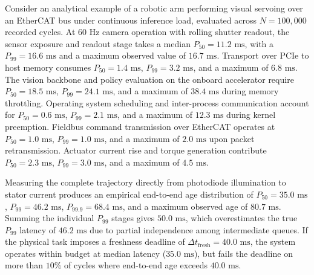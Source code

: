 \documentclass[
  letterpaper,
  DIV=11,
  numbers=noendperiod]{scrartcl}
\begin{document}
Consider an analytical example of a robotic arm performing visual
servoing over an EtherCAT bus under continuous inference load, evaluated
across \(N = 100{,}000\) recorded cycles. At \(60\text{ Hz}\) camera
operation with rolling shutter readout, the sensor exposure and readout
stage takes a median \(P_{50} = 11.2\text{ ms}\), with a
\(P_{99} = 16.6\text{ ms}\) and a maximum observed value of
\(16.7\text{ ms}\). Transport over PCIe to host memory consumes
\(P_{50} = 1.4\text{ ms}\), \(P_{99} = 3.2\text{ ms}\), and a maximum of
\(6.8\text{ ms}\). The vision backbone and policy evaluation on the
onboard accelerator require \(P_{50} = 18.5\text{ ms}\),
\(P_{99} = 24.1\text{ ms}\), and a maximum of \(38.4\text{ ms}\) during
memory throttling. Operating system scheduling and inter-process
communication account for \(P_{50} = 0.6\text{ ms}\),
\(P_{99} = 2.1\text{ ms}\), and a maximum of \(12.3\text{ ms}\) during
kernel preemption. Fieldbus command transmission over EtherCAT operates
at \(P_{50} = 1.0\text{ ms}\), \(P_{99} = 1.0\text{ ms}\), and a maximum
of \(2.0\text{ ms}\) upon packet retransmission. Actuator current rise
and torque generation contribute \(P_{50} = 2.3\text{ ms}\),
\(P_{99} = 3.0\text{ ms}\), and a maximum of \(4.5\text{ ms}\).

Measuring the complete trajectory directly from photodiode illumination
to stator current produces an empirical end-to-end age distribution of
\(P_{50} = 35.0\text{ ms}\), \(P_{99} = 46.2\text{ ms}\),
\(P_{99.9} = 68.4\text{ ms}\), and a maximum observed age of
\(80.7\text{ ms}\). Summing the individual \(P_{99}\) stages gives
\(50.0\text{ ms}\), which overestimates the true \(P_{99}\) latency of
\(46.2\text{ ms}\) due to partial independence among intermediate
queues. If the physical task imposes a freshness deadline of
\(\Delta t_{\text{fresh}} = 40.0\text{ ms}\), the system operates within
budget at median latency (\(35.0\text{ ms}\)), but fails the deadline on
more than \(10\%\) of cycles where end-to-end age exceeds
\(40.0\text{ ms}\).
\end{document}
